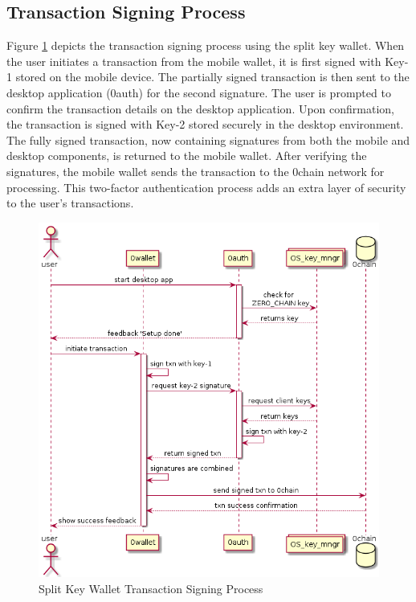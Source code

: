 \subsection{Transaction Signing Process}
Figure \ref{fig:transaction} depicts the transaction signing process using the split key wallet. When the user initiates a transaction from the mobile wallet, it is first signed with Key-1 stored on the mobile device. The partially signed transaction is then sent to the desktop application (0auth) for the second signature.
The user is prompted to confirm the transaction details on the desktop application. Upon confirmation, the transaction is signed with Key-2 stored securely in the desktop environment. The fully signed transaction, now containing signatures from both the mobile and desktop components, is returned to the mobile wallet. After verifying the signatures, the mobile wallet sends the transaction to the 0chain network for processing. This two-factor authentication process adds an extra layer of security to the user's transactions.
\begin{figure}[h]
\centering
\includegraphics[width=\textwidth]{Images/transaction_diagram.png}
\caption{Split Key Wallet Transaction Signing Process}
\label{fig:transaction}
\end{figure}
